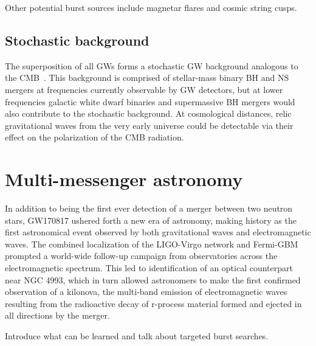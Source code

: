 Other potential burst sources include magnetar flares and cosmic string cusps.


\subsection{Stochastic background}

The superposition of all \acp{GW} forms a stochastic \ac{GW} background analogous to the \ac{CMB}~\citep{Christensen_2018}.
This background is comprised of stellar-mass binary \ac{BH} and \ac{NS} mergers at frequencies currently observable by \ac{GW} detectors, but at lower frequencies galactic white dwarf binaries and supermassive BH mergers would also contribute to the stochastic background.
At cosmological distances, relic gravitational waves from the very early universe could be detectable via their effect on the polarization of the \ac{CMB} radiation.


\section{Multi-messenger astronomy}

In addition to being the first ever detection of a merger between two neutron stars, GW170817 ushered forth a new era of astronomy, making history as the first astronomical event observed by both gravitational waves and electromagnetic waves.
The combined localization of the LIGO-Virgo network and Fermi-GBM prompted a world-wide follow-up campaign from observatories across the electromagnetic spectrum.
This led to identification of an optical counterpart near NGC 4993, which in turn allowed astronomers to make the first confirmed observation of a kilonova, the multi-band emission of electromagnetic waves resulting from the radioactive decay of r-process material formed and ejected in all directions by the merger.

{\color{red}Introduce what can be learned and talk about targeted burst searches.}
